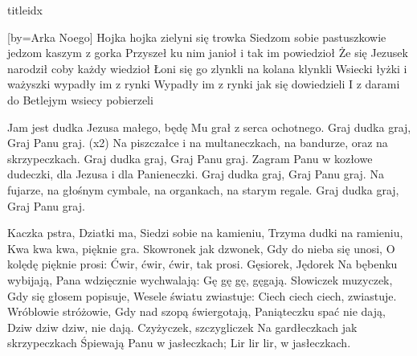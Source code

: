 \documentclass[a5paper, portrait, 12pt]{mwart}
\begin{document}
\begin{songs}{titleidx}



[by={Arka Noego}]
\beginverse
Hojka hojka \lrep zielyni się trowka \rrep {}
Siedzom sobie pastuszkowie jedzom kaszym z gorka 
Przyszeł ku nim janioł i tak im powiedzioł
Że się Jezusek narodził coby każdy wiedzioł 
Łoni się go zlynkli na kolana klynkli
Wsiecki łyżki i ważyszki wypadły im z rynki 
Wypadły im z rynki jak się dowiedzieli
I z darami do Betlejym wsiecy pobierzeli  
\endverse
\endsong


\beginverse
Jam jest dudka Jezusa małego,
będę Mu grał z serca ochotnego.
Graj dudka graj, Graj Panu graj. (x2)
\endverse
\beginverse
Na piszczałce i na multaneczkach,
na bandurze, oraz na skrzypeczkach.
Graj dudka graj, Graj Panu graj.
\endverse
\beginverse
Zagram Panu w kozłowe dudeczki,
dla Jezusa i dla Panieneczki.
Graj dudka graj, Graj Panu graj.
\endverse
\beginverse
Na fujarze, na głośnym cymbale,
na organkach, na starym regale.
Graj dudka graj, Graj Panu graj.
\endverse
\endsong


\beginverse
    Kaczka pstra, Dziatki ma,
\endverse
\beginchorus
    Siedzi sobie na kamieniu,
    Trzyma dudki na ramieniu,
    Kwa kwa kwa, pięknie gra.
\endchorus
\beginverse
    Skowronek jak dzwonek,
\endverse
\beginchorus
    Gdy do nieba się unosi,
    O kolędę pięknie prosi:
    Ćwir, ćwir, ćwir, tak prosi.
\endchorus
\beginverse
    Gęsiorek, Jędorek
\endverse
\beginchorus
    Na bębenku wybijają,
    Pana wdzięcznie wychwalają:
    Gę gę gę, gęgają.
\endchorus
\beginverse
    Słowiczek muzyczek,
\endverse
\beginchorus
    Gdy się głosem popisuje,
    Wesele światu zwiastuje:
    Ciech ciech ciech, zwiastuje.
\endchorus
\beginverse
    Wróblowie stróżowie,
\endverse
\beginchorus
    Gdy nad szopą świergotają,
    Paniąteczku spać nie dają,
    Dziw dziw dziw, nie dają.
\endchorus
\beginverse
    Czyżyczek, szczygliczek
\endverse
\beginchorus
    Na gardłeczkach jak skrzypeczkach
    Śpiewają Panu w jasłeczkach;
    Lir lir lir, w jasłeczkach.
\endchorus
\endsong

\end{songs}
\end{document}
